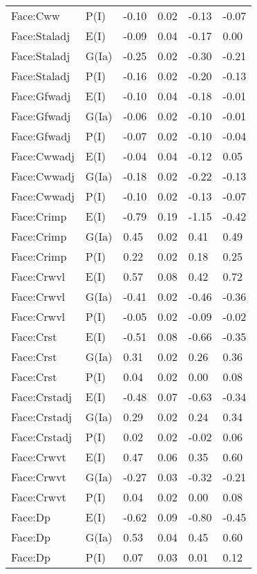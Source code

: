 \begin{center}
\begin{longtable}{|p{1.1in}|p{0.7in}|p{0.7in}|p{0.6in}|p{0.6in}|p{0.6in}|}
  Face:Cww & P(I) & -0.10 & 0.02 & -0.13 & -0.07 \\ 
  Face:Staladj & E(I) & -0.09 & 0.04 & -0.17 & 0.00 \\ 
  Face:Staladj & G(Ia) & -0.25 & 0.02 & -0.30 & -0.21 \\ 
  Face:Staladj & P(I) & -0.16 & 0.02 & -0.20 & -0.13 \\ 
  Face:Gfwadj & E(I) & -0.10 & 0.04 & -0.18 & -0.01 \\ 
  Face:Gfwadj & G(Ia) & -0.06 & 0.02 & -0.10 & -0.01 \\ 
  Face:Gfwadj & P(I) & -0.07 & 0.02 & -0.10 & -0.04 \\ 
  Face:Cwwadj & E(I) & -0.04 & 0.04 & -0.12 & 0.05 \\ 
  Face:Cwwadj & G(Ia) & -0.18 & 0.02 & -0.22 & -0.13 \\ 
  Face:Cwwadj & P(I) & -0.10 & 0.02 & -0.13 & -0.07 \\ 
  Face:Crimp & E(I) & -0.79 & 0.19 & -1.15 & -0.42 \\ 
  Face:Crimp & G(Ia) & 0.45 & 0.02 & 0.41 & 0.49 \\ 
  Face:Crimp & P(I) & 0.22 & 0.02 & 0.18 & 0.25 \\ 
  Face:Crwvl & E(I) & 0.57 & 0.08 & 0.42 & 0.72 \\ 
  Face:Crwvl & G(Ia) & -0.41 & 0.02 & -0.46 & -0.36 \\ 
  Face:Crwvl & P(I) & -0.05 & 0.02 & -0.09 & -0.02 \\ 
  Face:Crst & E(I) & -0.51 & 0.08 & -0.66 & -0.35 \\ 
  Face:Crst & G(Ia) & 0.31 & 0.02 & 0.26 & 0.36 \\ 
  Face:Crst & P(I) & 0.04 & 0.02 & 0.00 & 0.08 \\ 
  Face:Crstadj & E(I) & -0.48 & 0.07 & -0.63 & -0.34 \\ 
  Face:Crstadj & G(Ia) & 0.29 & 0.02 & 0.24 & 0.34 \\ 
  Face:Crstadj & P(I) & 0.02 & 0.02 & -0.02 & 0.06 \\ 
  Face:Crwvt & E(I) & 0.47 & 0.06 & 0.35 & 0.60 \\ 
  Face:Crwvt & G(Ia) & -0.27 & 0.03 & -0.32 & -0.21 \\ 
  Face:Crwvt & P(I) & 0.04 & 0.02 & 0.00 & 0.08 \\ 
  Face:Dp & E(I) & -0.62 & 0.09 & -0.80 & -0.45 \\ 
  Face:Dp & G(Ia) & 0.53 & 0.04 & 0.45 & 0.60 \\ 
  Face:Dp & P(I) & 0.07 & 0.03 & 0.01 & 0.12 \\ 

\end{longtable}
\end{center}
